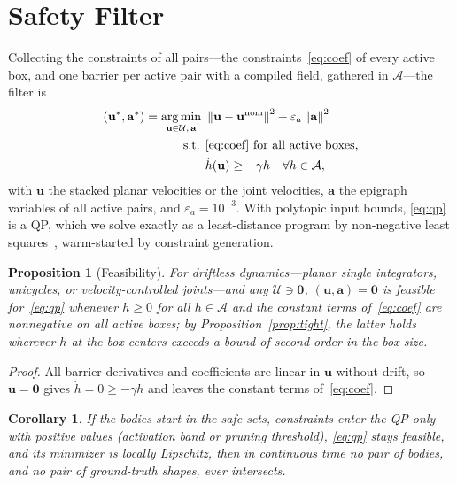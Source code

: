 \documentclass[journal]{IEEEtran}
\newtheorem{proposition}{Proposition}
\newtheorem{corollary}{Corollary}
\theoremstyle{definition}
\newcommand{\norm}[1]{\left\lVert #1\right\rVert}
\DeclareMathOperator*{\argmin}{arg\,min}
\begin{document}
\section{Safety Filter}\label{sec:filter}
Collecting the constraints of all pairs---the constraints~\eqref{eq:coef} of every active
box, and one barrier per active pair with a compiled field, gathered in $\mathcal A$---the filter is
\begin{equation}\label{eq:qp}
\begin{aligned}
(\mathbf u^\ast,\mathbf a^\ast)=\argmin_{\mathbf u\in\mathcal U,\,\mathbf a}\ &\norm{\mathbf u-\mathbf u^{\rm nom}}^2+\varepsilon_a\norm{\mathbf a}^2\\
\text{s.t. }&\eqref{eq:coef}\ \text{for all active boxes},\\
&\dot h(\mathbf u)\ge-\gamma h\quad\forall h\in\mathcal A,
\end{aligned}
\end{equation}
with $\mathbf u$ the stacked planar velocities or the joint velocities, $\mathbf a$ the epigraph
variables of all active pairs, and $\varepsilon_a=10^{-3}$. With
polytopic input bounds, \eqref{eq:qp} is a QP, which we solve exactly as a least-distance program by
non-negative least squares~\cite{lawson1995solving}, warm-started by constraint generation.
\begin{proposition}[Feasibility]\label{prop:feas}
For driftless dynamics---planar single integrators, unicycles, or velocity-controlled joints---and
any $\mathcal U\ni\mathbf 0$, $(\mathbf u,\mathbf a)=\mathbf 0$ is feasible for~\eqref{eq:qp} whenever
$h\ge0$ for all $h\in\mathcal A$ and the constant terms of~\eqref{eq:coef} are nonnegative on all active
boxes; by Proposition~\ref{prop:tight}, the latter holds wherever $\tilde h$ at the box centers exceeds
a bound of second order in the box size.
\end{proposition}
\begin{proof}
All barrier derivatives and coefficients are linear in $\mathbf u$ without drift, so $\mathbf u=\mathbf 0$
gives $\dot h=0\ge-\gamma h$ and leaves the constant terms of~\eqref{eq:coef}.
\end{proof}
\begin{corollary}\label{cor:closed}
If the bodies start in the safe sets, constraints enter the QP only with positive values (activation
band or pruning threshold), \eqref{eq:qp} stays feasible, and its minimizer is locally Lipschitz,
then in continuous time no pair of bodies, and no pair of ground-truth shapes, ever intersects.
\end{corollary}
\end{document}
